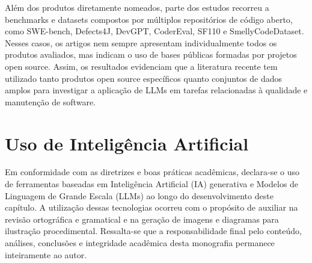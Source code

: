 Além dos produtos diretamente nomeados, parte dos estudos recorreu a benchmarks e datasets compostos por múltiplos repositórios de código aberto, como SWE-bench, Defects4J, DevGPT, CoderEval, SF110 e SmellyCodeDataset. Nesses casos, os artigos nem sempre apresentam individualmente todos os produtos avaliados, mas indicam o uso de bases públicas formadas por projetos open source. Assim, os resultados evidenciam que a literatura recente tem utilizado tanto produtos open source específicos quanto conjuntos de dados amplos para investigar a aplicação de LLMs em tarefas relacionadas à qualidade e manutenção de software.

\section{Uso de Inteligência Artificial}

Em conformidade com as diretrizes e boas práticas acadêmicas, declara-se o uso de ferramentas baseadas em Inteligência Artificial (IA) generativa e Modelos de Linguagem de Grande Escala (LLMs) ao longo do desenvolvimento deste capítulo. A utilização dessas tecnologias ocorreu com o propósito de auxiliar na revisão ortográfica e gramatical e na geração de imagens e diagramas para ilustração procedimental. Ressalta-se que a responsabilidade final pelo conteúdo, análises, conclusões e integridade acadêmica desta monografia permanece inteiramente ao autor.